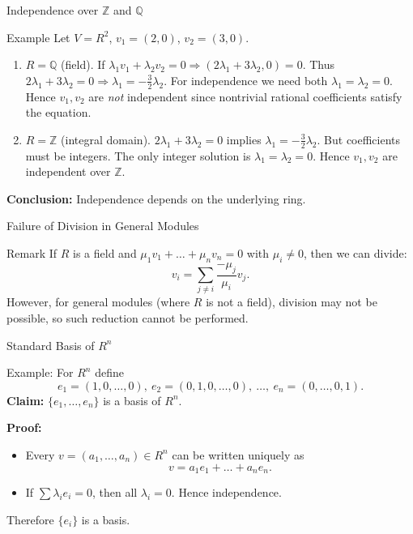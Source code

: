 \documentclass[11pt,aspectratio=43,ignorenonframetext,t]{beamer}
\begin{document}
\begin{frame}{Independence over $\mathbb{Z}$ and $\mathbb{Q}$}
\begin{block}{Example}
    Let $V=R^2$, $v_1=(2,0)$, $v_2=(3,0)$.
\begin{enumerate}
    \item$R=\mathbb{Q}$ (field). If $\lambda_1 v_1 + \lambda_2 v_2 = 0 \Rightarrow (2\lambda_1 + 3\lambda_2, 0)=0$. Thus $2\lambda_1+3\lambda_2=0 \Rightarrow \lambda_1=-\tfrac{3}{2}\lambda_2$.  
For independence we need both $\lambda_1=\lambda_2=0$. Hence $v_1,v_2$ are \textit{not} independent since nontrivial rational coefficients satisfy the equation.\
    \item $R=\mathbb{Z}$ (integral domain).  
$2\lambda_1+3\lambda_2=0$ implies $\lambda_1=-\tfrac{3}{2}\lambda_2$.  
But coefficients must be integers. The only integer solution is $\lambda_1=\lambda_2=0$.  
Hence $v_1,v_2$ are independent over $\mathbb{Z}$.
\end{enumerate}


\textbf{Conclusion:}  
Independence depends on the underlying ring.
\end{block}

\end{frame}

\begin{frame}{Failure of Division in General Modules}
\begin{block}{Remark}
If $R$ is a field and $\mu_1v_1+\dots+\mu_nv_n=0$ with $\mu_i\ne0$, then we can divide:
\[
v_i = \sum_{j\ne i} \frac{-\mu_j}{\mu_i} v_j.
\]
However, for general modules (where $R$ is not a field), division may not be possible, so such reduction cannot be performed.    
\end{block}

\end{frame}


\begin{frame}{Standard Basis of $R^n$}
\begin{block}{Example:}
    For $R^n$ define
\[
e_1=(1,0,\dots,0), \ e_2=(0,1,0,\dots,0), \ \dots, \ e_n=(0,\dots,0,1).
\]
\textbf{Claim:} $\{e_1,\dots,e_n\}$ is a basis of $R^n$.
\end{block}

\textbf{Proof:}
\begin{itemize}
  \item Every $v=(a_1,\dots,a_n)\in R^n$ can be written uniquely as
  \[
  v = a_1 e_1+\dots+a_n e_n.
  \]
  \item If $\sum \lambda_i e_i=0$, then all $\lambda_i=0$. Hence independence.
\end{itemize}
Therefore $\{e_i\}$ is a basis.
\end{frame}
\end{document}
